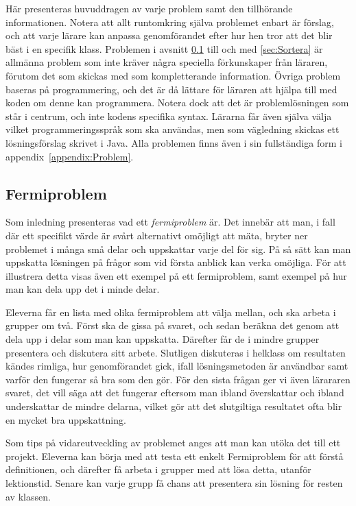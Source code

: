\textcolor{lila}{Här presenteras huvuddragen av varje problem samt den tillhörande informationen. Notera att allt runtomkring själva problemet enbart är förslag, och att varje lärare kan anpassa genomförandet efter hur hen tror att det blir bäst i en specifik klass. Problemen i avsnitt \ref{sec:Fermi} till och med \ref{sec:Sortera} är allmänna problem som inte kräver några speciella förkunskaper från läraren, förutom det som skickas med som kompletterande information. Övriga problem baseras på programmering, och det är då lättare för läraren att hjälpa till med koden om denne kan programmera. Notera dock att det är problemlösningen som står i centrum, och inte kodens specifika syntax. Lärarna får även själva välja vilket programmeringsspråk som ska användas, men som vägledning skickas ett lösningsförslag skrivet i Java. Alla problemen finns även i sin fullständiga form i appendix~\ref{appendix:Problem}.}

\subsection{Fermiproblem}
    \label{sec:Fermi}
 
    \textcolor{lila}{Som inledning presenteras vad ett \textsl{fermiproblem} är. Det innebär att man, i fall där ett specifikt värde är svårt alternativt omöjligt att mäta, bryter ner problemet i många små delar och uppskattar varje del för sig. På så sätt kan man uppskatta lösningen på frågor som vid första anblick kan verka omöjliga. För att illustrera detta visas även ett exempel på ett fermiproblem, samt exempel på hur man kan dela upp det i minde delar.}

    \textcolor{lila}{Eleverna får en lista med olika fermiproblem att välja mellan, och ska arbeta i grupper om två. Först ska de gissa på svaret, och sedan beräkna det genom att dela upp i delar som man kan uppskatta. Därefter får de i mindre grupper presentera och diskutera sitt arbete. Slutligen diskuteras i helklass om resultaten kändes rimliga, hur genomförandet gick, ifall lösningsmetoden är användbar samt varför den fungerar så bra som den gör. För den sista frågan ger vi även lärararen svaret, det vill säga att det fungerar eftersom man ibland överskattar och ibland underskattar de mindre delarna, vilket gör att det slutgiltiga resultatet ofta blir en mycket bra uppskattning.}
    
    \textcolor{lila}{Som tips på vidareutveckling av problemet anges att man kan utöka det till ett projekt. Eleverna kan börja med att testa ett enkelt Fermiproblem för att förstå definitionen, och därefter få arbeta i grupper med att lösa detta, utanför lektionstid. Senare kan varje grupp få chans att presentera sin lösning för resten av klassen.}
    
